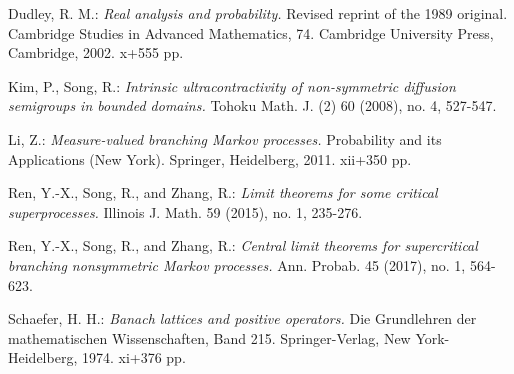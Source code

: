 \documentclass[12pt,a4paper]{amsart}
\numberwithin{equation}{section}
\theoremstyle{plain}
\theoremstyle{definition}
\theoremstyle{remark}
\newcounter{N}
\newcounter{n}[N]
\begin{document}
\begin{thebibliography}{99}

Dudley, R. M.:
\emph{Real analysis and probability.}
Revised reprint of the 1989 original. Cambridge Studies in Advanced Mathematics, 74. Cambridge University Press, Cambridge, 2002. x+555 pp.

Kim, P., Song, R.:
\emph{Intrinsic ultracontractivity of non-symmetric diffusion semigroups in bounded domains.}
Tohoku Math. J. (2) 60 (2008), no. 4, 527-547.

Li, Z.:
\emph{Measure-valued branching Markov processes.}
Probability and its Applications (New York). Springer, Heidelberg, 2011. xii+350 pp.

Ren, Y.-X., Song, R., and Zhang, R.:
\emph{Limit theorems for some critical superprocesses.}
Illinois J. Math. 59 (2015), no. 1, 235-276.

Ren, Y.-X., Song, R., and Zhang, R.:
\emph{Central limit theorems for supercritical branching nonsymmetric Markov processes.}
Ann. Probab. 45 (2017), no. 1, 564-623.

Schaefer, H. H.:
\emph{Banach lattices and positive operators.}
Die Grundlehren der mathematischen Wissenschaften, Band 215. Springer-Verlag, New York-Heidelberg, 1974. xi+376 pp.
\end{thebibliography}
\end{document}
